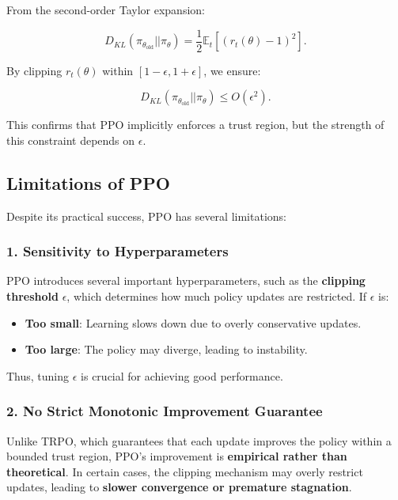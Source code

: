 \documentclass[12pt]{extreport} %
\begin{document}
From the second-order Taylor expansion:

\begin{equation}
D_{KL}(\pi_{\theta_{\text{old}}} || \pi_{\theta}) = \frac{1}{2} \mathbb{E}_t \left[ (r_t(\theta) - 1)^2 \right].
\end{equation}

By clipping \( r_t(\theta) \) within \( [1-\epsilon, 1+\epsilon] \), we ensure:

\begin{equation}
D_{KL}(\pi_{\theta_{\text{old}}} || \pi_{\theta}) \leq O(\epsilon^2).
\end{equation}

This confirms that PPO implicitly enforces a trust region, but the strength of this constraint depends on \( \epsilon \).

\subsection{\textbf{Limitations of PPO}}

Despite its practical success, PPO has several limitations:

\subsubsection{1. \textbf{Sensitivity to Hyperparameters}}

PPO introduces several important hyperparameters, such as the \textbf{clipping threshold} \( \epsilon \), which determines how much policy updates are restricted. If \( \epsilon \) is:

\begin{itemize}
    \item \textbf{Too small}: Learning slows down due to overly conservative updates.
    \item \textbf{Too large}: The policy may diverge, leading to instability.
\end{itemize}

Thus, tuning \( \epsilon \) is crucial for achieving good performance.

\subsubsection{2. \textbf{No Strict Monotonic Improvement Guarantee}}

Unlike TRPO, which guarantees that each update improves the policy within a bounded trust region, PPO's improvement is \textbf{empirical rather than theoretical}. In certain cases, the clipping mechanism may overly restrict updates, leading to \textbf{slower convergence or premature stagnation}.
\end{document}
